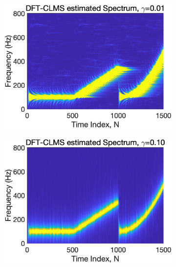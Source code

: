 \begin{figure}[htb]
     \centering
     \hspace{-0.4cm}
     \begin{subfigure}[b]{0.33\textwidth}
         \centering
         \includegraphics[width=\textwidth]{fig/33/33c2.eps}
     \end{subfigure}
    \hspace{-0.4cm}
     \begin{subfigure}[b]{0.33\textwidth}
         \centering
         \includegraphics[width=\textwidth]{fig/33/33c3.eps}
     \end{subfigure}
    \hspace{-0.4cm}
     \begin{subfigure}[b]{0.33\textwidth}

\end{subfigure}
\end{figure}
